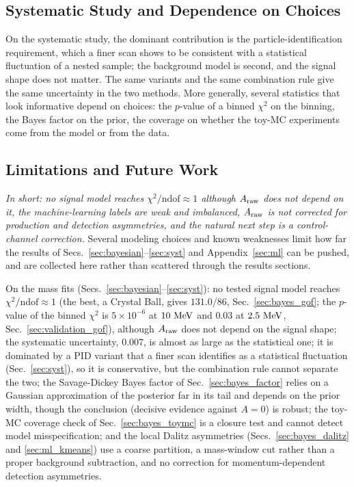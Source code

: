 \subsection{Systematic Study and Dependence on Choices}
On the systematic study, the dominant contribution is the particle-identification requirement, which a finer scan shows to be consistent with a statistical fluctuation of a nested sample; the background model is second, and the signal shape does not matter. The same variants and the same combination rule give the same uncertainty in the two methods. More generally, several statistics that look informative depend on choices: the $p$-value of a binned $\chi^2$ on the binning, the Bayes factor on the prior, the coverage on whether the toy-MC experiments come from the model or from the data.

\subsection{Limitations and Future Work}
\label{sec:limitations}
\emph{In short: no signal model reaches $\chi^2/\mathrm{ndof}\approx1$ although $A_{\mathrm{raw}}$ does not depend on it, the machine-learning labels are weak and imbalanced, $A_{\mathrm{raw}}$ is not corrected for production and detection asymmetries, and the natural next step is a control-channel correction.}
Several modeling choices and known weaknesses limit how far the results of Secs.~\ref{sec:bayesian}--\ref{sec:syst} and Appendix~\ref{sec:ml} can be pushed, and are collected here rather than scattered through the results sections.

On the mass fits (Secs.~\ref{sec:bayesian}--\ref{sec:syst}): no tested signal model reaches $\chi^2/\mathrm{ndof}\approx1$ (the best, a Crystal Ball, gives $131.0/86$, Sec.~\ref{sec:bayes_gof}; the $p$-value of the binned $\chi^2$ is $5\times10^{-6}$ at $10\,\,\text{Me\hspace{-.08em}V}$ and $0.03$ at $2.5\,\,\text{Me\hspace{-.08em}V}$, Sec.~\ref{sec:validation_gof}), although $A_{\mathrm{raw}}$ does not depend on the signal shape; the systematic uncertainty, $0.007$, is almost as large as the statistical one; it is dominated by a PID variant that a finer scan identifies as a statistical fluctuation (Sec.~\ref{sec:syst}), so it is conservative, but the combination rule cannot separate the two; the Savage-Dickey Bayes factor of Sec.~\ref{sec:bayes_factor} relies on a Gaussian approximation of the posterior far in its tail and depends on the prior width, though the conclusion (decisive evidence against $A=0$) is robust; the toy-MC coverage check of Sec.~\ref{sec:bayes_toymc} is a closure test and cannot detect model misspecification; and the local Dalitz asymmetries (Secs.~\ref{sec:bayes_dalitz} and \ref{sec:ml_kmeans}) use a coarse partition, a mass-window cut rather than a proper background subtraction, and no correction for momentum-dependent detection asymmetries.

